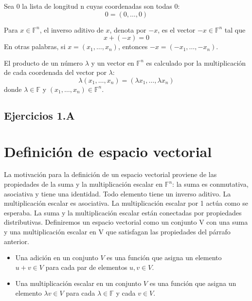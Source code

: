 \begin{tcolorbox}[colback=white]
    \begin{def.}[$0$]
	Sea $0$ la lista de longitud n cuyas coordenadas son todas 0: 
	$$0=(0,\ldots,0)$$
    \end{def.}
\end{tcolorbox}

\begin{tcolorbox}[colback=white]
    \begin{def.}
	Para $x\in \mathbb{F}^n$, el inverso aditivo de $x$, denota por $-x$, es el vector $-x\in \mathbb{F}^n$ tal que $$x+(-x) =0$$
	En otras palabras, si $x=(x_1,\ldots,x_n)$, entonces $-x=(-x_1,\ldots,-x_n).$
    \end{def.}
\end{tcolorbox}


\begin{tcolorbox}[colback=white]
    \begin{def.}
	El producto de un número $\lambda$ y un vector en $\mathbb{F}^n$ es calculado por la multiplicación de cada coordenada del vector por $\lambda$:
	$$\lambda(x_1,\ldots,x_n) = (\lambda x_1,\ldots, \lambda x_n)$$
	donde $\lambda \in \mathbb{F}$ y $(x_1,\ldots,x_n)\in \mathbb{F}^n$.
    \end{def.}
\end{tcolorbox}

\subsection{Ejercicios 1.A}


\section{Definición de espacio vectorial}
La motivación para la definición de un espacio vectorial proviene de las propiedades de la suma y la multiplicación escalar en $\mathbb{F}^n$: la suma es conmutativa, asociativa y tiene una identidad. Todo elemento tiene un inverso aditivo. La multiplicación escalar es asociativa. La multiplicación escalar por 1 actúa como se esperaba. La suma y la multiplicación escalar están conectadas por propiedades distributivas. Definiremos un espacio vectorial como un conjunto V con una suma y una multiplicación escalar en V que satisfagan las propiedades del párrafo anterior.

\begin{tcolorbox}[colback=white]
    \begin{def.}\hfill
	\begin{itemize}
	    \item Una adición en un conjunto $V$ es una función que asigna un elemento $u+v\in V$ para cada par de elementos $u,v\in V$.
	    \item Una multiplicación escalar en un conjunto $V$ es una función que asigna un elemento $\lambda  v\in V$ para cada $\lambda \in \mathbb{F}$ y cada $v\in V$.
	\end{itemize}
    \end{def.}
\end{tcolorbox}

